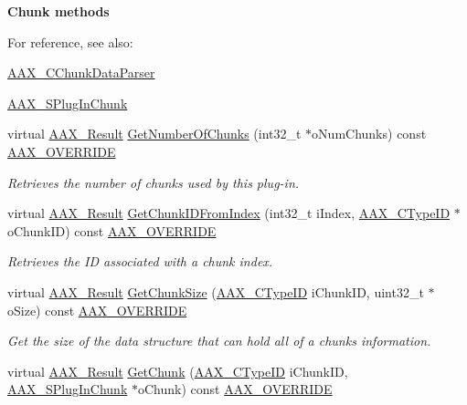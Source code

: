 \begin{Indent}{\bf Chunk methods}
{For reference, see also\+: \begin{DoxyItemize}
\item \hyperlink{a00014}{A\+A\+X\+\_\+\+C\+Chunk\+Data\+Parser} \item \hyperlink{a00125}{A\+A\+X\+\_\+\+S\+Plug\+In\+Chunk} \end{DoxyItemize}
}\begin{DoxyCompactItemize}
\item 
virtual \hyperlink{a00149_a4d8f69a697df7f70c3a8e9b8ee130d2f}{A\+A\+X\+\_\+\+Result} \hyperlink{a00018_a901448cbb416cbe3c169a8577de554e4}{Get\+Number\+Of\+Chunks} (int32\+\_\+t $\ast$o\+Num\+Chunks) const \hyperlink{a00149_ac2f24a5172689ae684344abdcce55463}{A\+A\+X\+\_\+\+O\+V\+E\+R\+R\+I\+D\+E}
\begin{DoxyCompactList}\small\item\em Retrieves the number of chunks used by this plug-\/in. \end{DoxyCompactList}\item 
virtual \hyperlink{a00149_a4d8f69a697df7f70c3a8e9b8ee130d2f}{A\+A\+X\+\_\+\+Result} \hyperlink{a00018_a39f0deaae61b977a3c05a4b3fb606b8d}{Get\+Chunk\+I\+D\+From\+Index} (int32\+\_\+t i\+Index, \hyperlink{a00149_ac678f9c1fbcc26315d209f71a147a175}{A\+A\+X\+\_\+\+C\+Type\+I\+D} $\ast$o\+Chunk\+I\+D) const \hyperlink{a00149_ac2f24a5172689ae684344abdcce55463}{A\+A\+X\+\_\+\+O\+V\+E\+R\+R\+I\+D\+E}
\begin{DoxyCompactList}\small\item\em Retrieves the I\+D associated with a chunk index. \end{DoxyCompactList}\item 
virtual \hyperlink{a00149_a4d8f69a697df7f70c3a8e9b8ee130d2f}{A\+A\+X\+\_\+\+Result} \hyperlink{a00018_a9e4afba12f3e778a91f9afec9ef44c78}{Get\+Chunk\+Size} (\hyperlink{a00149_ac678f9c1fbcc26315d209f71a147a175}{A\+A\+X\+\_\+\+C\+Type\+I\+D} i\+Chunk\+I\+D, uint32\+\_\+t $\ast$o\+Size) const \hyperlink{a00149_ac2f24a5172689ae684344abdcce55463}{A\+A\+X\+\_\+\+O\+V\+E\+R\+R\+I\+D\+E}
\begin{DoxyCompactList}\small\item\em Get the size of the data structure that can hold all of a chunk\textquotesingle{}s information. \end{DoxyCompactList}\item 
virtual \hyperlink{a00149_a4d8f69a697df7f70c3a8e9b8ee130d2f}{A\+A\+X\+\_\+\+Result} \hyperlink{a00018_a2526332264a5a0c7b06ecf76e58a67d9}{Get\+Chunk} (\hyperlink{a00149_ac678f9c1fbcc26315d209f71a147a175}{A\+A\+X\+\_\+\+C\+Type\+I\+D} i\+Chunk\+I\+D, \hyperlink{a00125}{A\+A\+X\+\_\+\+S\+Plug\+In\+Chunk} $\ast$o\+Chunk) const \hyperlink{a00149_ac2f24a5172689ae684344abdcce55463}{A\+A\+X\+\_\+\+O\+V\+E\+R\+R\+I\+D\+E}

\end{DoxyCompactItemize}
\end{Indent}
